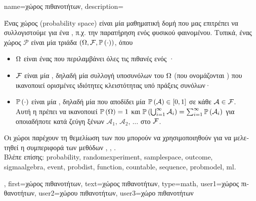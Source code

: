 {name={\foreignlanguage{greek}{χώρος πιθανοτήτων}}, 
 	description={\foreignlanguage{greek}{Ένας χώρος}  
		(probability space) \foreignlanguage{greek}{είναι μία μαθηματική δομή που μας επιτρέπει να συλλογιστούμε για ένα} 
		, \foreignlanguage{greek}{π.χ. την παρατήρηση ενός φυσικού φαινομένου. Τυπικά, ένας χώρος} 
		 $\mathcal{P}$ \foreignlanguage{greek}{είναι μία τριάδα $(\Omega, \mathcal{F}, \mathbb{P}\left(\cdot\right))$, όπου}
 		\begin{itemize} 
 			\item $\Omega$ \foreignlanguage{greek}{είναι ένας}  \foreignlanguage{greek}{που περιλαμβάνει όλες 
				τις πιθανές}  \foreignlanguage{greek}{ενός} ·
 			\item $\mathcal{F}$ \foreignlanguage{greek}{είναι μία} , \foreignlanguage{greek}{δηλαδή μία συλλογή 
				υποσυνόλων του $\Omega$ (που ονομάζονται} ) \foreignlanguage{greek}{που ικανοποιεί ορισμένες 
				ιδιότητες κλειστότητας υπό πράξεις συνόλων·}
 			\item $\mathbb{P}\left(\cdot\right)$ \foreignlanguage{greek}{είναι μία} , \foreignlanguage{greek}{δηλαδή μία}  
				\foreignlanguage{greek}{που αποδίδει μία}  $\mathbb{P}\left(\mathcal{A}\right) \in [0,1]$ 
 				\foreignlanguage{greek}{σε κάθε}  $\mathcal{A} \in \mathcal{F}$. \foreignlanguage{greek}{Αυτή η} 
				 \foreignlanguage{greek}{πρέπει να ικανοποιεί $\mathbb{P}\left(\Omega\right) = 1$ και 
				$\mathbb{P}\left(\bigcup_{i=1}^{\infty} \mathcal{A}_i\right) = \sum_{i=1}^{\infty} \mathbb{P}\left(\mathcal{A}_i\right)$ για οποιαδήποτε}  
				 \foreignlanguage{greek}{κατά ζεύγη ξένων}  
				$\mathcal{A}_1, \,\mathcal{A}_2, \,\ldots$ \foreignlanguage{greek}{στο} $\mathcal{F}$.
 		\end{itemize}
 		\foreignlanguage{greek}{Οι χώροι}  \foreignlanguage{greek}{παρέχουν τη θεμελίωση των}  
		\foreignlanguage{greek}{που μπορούν να χρησιμοποιηθούν για να μελετηθεί η συμπεριφορά των μεθόδων} 
		\cite{BillingsleyProbMeasure}, \cite{GrayProbBook}, \cite{ross2013first}.
		\\
		\foreignlanguage{greek}{Βλέπε επίσης:} \gls{probability}, \gls{randomexperiment}, \gls{samplespace}, \gls{outcome}, \gls{sigmaalgebra}, \gls{event}, 
		\gls{probdist}, \gls{function}, \gls{countable}, \gls{sequence}, \gls{probmodel}, \gls{ml}.},  
 	first={\foreignlanguage{greek}{χώρος πιθανοτήτων}}, 
 	text={\foreignlanguage{greek}{χώρος πιθανοτήτων}},
	type=math,
	user1={\foreignlanguage{greek}{χώρος πιθανοτήτων}}, %
  	user2={\foreignlanguage{greek}{χώρου πιθανοτήτων}}, %
	user3={\foreignlanguage{greek}{χώρο πιθανοτήτων}} %
}

